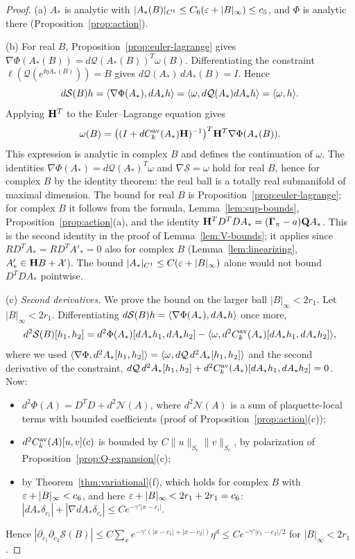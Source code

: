 \begin{proof}
(a) $A_*$ is analytic with $|A_*(B)|_{C^1}\le C_6(\varepsilon+|B|_\infty)\le c_5$, and $\Phi$ is analytic there (Proposition~\ref{prop:action}).

(b) For real $B$, Proposition~\ref{prop:euler-lagrange} gives $\nabla\Phi(A_*(B))=d\mathcal Q(A_*(B))^T\omega(B)$. Differentiating the constraint $\ell(\mathcal Q(e^{\ii\eta A_*(B)}))=B$ gives $d\mathcal Q(A_*)\,dA_*(B)=I$. Hence
\[
d\mathcal S(B)h=\langle \nabla\Phi(A_*),dA_*h\rangle=\langle \omega,d\mathcal Q(A_*)dA_*h\rangle=\langle \omega,h\rangle .
\]
Applying $\mathbf H^T$ to the Euler--Lagrange equation gives
\[
\omega(B)=\big((I+dC^{\rm av}_k(A_*)\mathbf H)^{-1}\big)^T\mathbf H^T\nabla\Phi(A_*(B)).
\] This expression is analytic in complex $B$ and defines the continuation of $\omega$. The identities $\nabla\Phi(A_*)=d\mathcal Q(A_*)^T\omega$ and $\nabla\mathcal S=\omega$ hold for real $B$, hence for complex $B$ by the identity theorem: the real ball is a totally real submanifold of maximal dimension. The bound for real $B$ is Proposition~\ref{prop:euler-lagrange}; for complex $B$ it follows from the formula, Lemma~\ref{lem:sup-bounds}, Proposition~\ref{prop:action}(a), and the identity $\mathbf H^TD^TDA_*=(\boldsymbol\Gamma_\pi-a)\mathbf Q A_*$. This is the second identity in the proof of Lemma~\ref{lem:V-bounds}; it applies since $RD^TA_*=RD^TA'_*=0$ also for complex $B$ (Lemma~\ref{lem:linearizing}, $A'_*\in\mathbf H B+\mathcal X$). The bound $|A_*|_{C^1}\le C(\varepsilon+|B|_\infty)$ alone would not bound $D^TDA_*$ pointwise.

(c) \emph{Second derivatives.} We prove the bound on the larger ball $|B|_\infty<2r_1$. Let $|B|_\infty<2r_1$. Differentiating $d\mathcal S(B)h=\langle \nabla\Phi(A_*),dA_*h\rangle$ once more,
\[
d^2\mathcal S(B)[h_1,h_2]=d^2\Phi(A_*)[dA_*h_1,dA_*h_2]-\langle \omega,d^2C^{\rm av}_k(A_*)[dA_*h_1,dA_*h_2]\rangle,
\]
where we used $\langle \nabla\Phi,d^2A_*[h_1,h_2]\rangle=\langle \omega,d\mathcal Q\,d^2A_*[h_1,h_2]\rangle$ and the second derivative of the constraint, $d\mathcal Q\,d^2A_*[h_1,h_2]+d^2C^{\rm av}_k(A_*)[dA_*h_1,dA_*h_2]=0$. Now:
\begin{itemize}
\item $d^2\Phi(A)=D^TD+d^2\mathcal N(A)$, where $d^2\mathcal N(A)$ is a sum of plaquette-local terms with bounded coefficients (proof of Proposition~\ref{prop:action}(c));
\item $d^2C^{\rm av}_k(A)[u,v](c)$ is bounded by $C\|u\|_{S_c}\|v\|_{S_c}$, by polarization of Proposition~\ref{prop:Q-expansion}(c);
\item by Theorem~\ref{thm:variational}(f), which holds for complex $B$ with $\varepsilon+|B|_\infty<c_6$, and here $\varepsilon+|B|_\infty<2r_1+2r_1=c_6$: $|dA_*\delta_{c_i}|+|\nabla dA_*\delta_{c_i}|\le Ce^{-\gamma'|x-c_i|}$.
\end{itemize}
Hence $|\partial_{c_1}\partial_{c_2}\mathcal S(B)|\le C\sum_xe^{-\gamma'(|x-c_1|+|x-c_2|)}\eta^d\le Ce^{-\gamma'|c_1-c_2|/2}$ for $|B|_\infty<2r_1$.


\end{proof}
